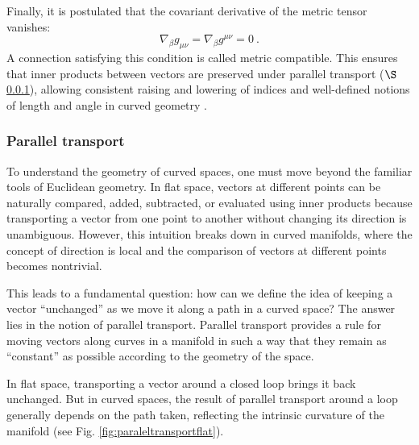 Finally, it is postulated that the covariant derivative of the metric tensor vanishes:
\begin{equation}
\nabla_\beta g_{\mu \nu} = \nabla_\beta g^{\mu \nu} = 0 \ .
\end{equation}
A connection satisfying this condition is called metric compatible. This ensures that inner products between vectors are preserved under parallel transport ($\S$\ref{parallel transport}), allowing consistent raising and lowering of indices and well-defined notions of length and angle in curved geometry \cite{Llibre_Peter_Collier_unacosadificildecomprender}.


\subsubsection{Parallel transport }
\label{parallel transport}


To understand the geometry of curved spaces, one must move beyond the familiar tools of Euclidean geometry. In flat space, vectors at different points can be naturally compared, added, subtracted, or evaluated using inner products because transporting a vector from one point to another without changing its direction is unambiguous. However, this intuition breaks down in curved manifolds, where the concept of direction is local and the comparison of vectors at different points becomes nontrivial.

This leads to a fundamental question: how can we define the idea of keeping a vector “unchanged” as we move it along a path in a curved space? The answer lies in the notion of parallel transport. Parallel transport provides a rule for moving vectors along curves in a manifold in such a way that they remain as “constant” as possible according to the geometry of the space.

In flat space, transporting a vector around a closed loop brings it back unchanged. But in curved spaces, the result of parallel transport around a loop generally depends on the path taken, reflecting the intrinsic curvature of the manifold (see Fig. \ref{fig:paraleltransportflat}). 

